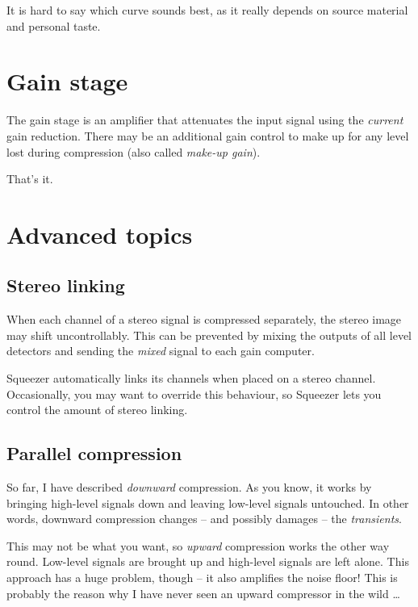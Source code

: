It is hard to say which curve sounds best, as it really depends on
source material and personal taste.

\section{Gain stage}
\label{sec:gain_stage}

The gain stage is an amplifier that attenuates the input signal using
the \emph{current} gain reduction.  There may be an additional gain
control to make up for any level lost during compression (also called
\emph{make-up gain}).

That's it.

\section{Advanced topics}
\label{sec:advanced_topics}

\subsection{Stereo linking}
\label{sec:stereo_linking}

When each channel of a stereo signal is compressed separately, the
stereo image may shift uncontrollably.  This can be prevented by
mixing the outputs of all level detectors and sending the \emph{mixed}
signal to each gain computer.

Squeezer automatically links its channels when placed on a stereo
channel.  Occasionally, you may want to override this behaviour, so
Squeezer lets you control the amount of stereo linking.

\subsection{Parallel compression}
\label{sec:parallel_compression}

So far, I have described \emph{downward} compression.  As you know, it
works by bringing high-level signals down and leaving low-level
signals untouched.  In other words, downward compression changes --
and possibly damages -- the \emph{transients}.

This may not be what you want, so \emph{upward} compression works the
other way round.  Low-level signals are brought up and high-level
signals are left alone.  This approach has a huge problem, though --
it also amplifies the noise floor!  This is probably the reason why I
have never seen an upward compressor in the wild \dots

